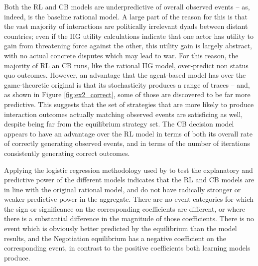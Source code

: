 Both the RL and CB models are underpredictive of overall observed events -- as, indeed, is the baseline rational model. A large part of the reason for this is that the vast majority of interactions are politically irrelevant dyads between distant countries; even if the IIG utility calculations indicate that one actor has utility to gain from threatening force against the other, this utility gain is largely abstract, with no actual concrete disputes which may lead to war. For this reason, the majority of RL an CB runs, like the rational IIG model, over-predict non status quo outcomes. However, an advantage that the agent-based model has over the game-theoretic original is that its stochasticity produces a range of traces -- and, as shown in Figure \ref{fig:ex2_correct}, some of those are discovered to be far more predictive. This suggests that the set of strategies that are more likely to produce interaction outcomes actually matching observed events are satisficing as well, despite being far from the equilibrium strategy set. The CB decision model appears to have an advantage over the RL model in terms of both its overall rate of correctly generating observed events, and in terms of the number of iterations consistently generating correct outcomes.

Applying the logistic regression methodology used by \citet{bennett_2000} to test the explanatory and predictive power of the different models indicates that the RL and CB models are in line with the original rational model, and do not have radically stronger or weaker predictive power in the aggregate. There are no event categories for which the sign or significance on the corresponding coefficients are different, or where there is a substantial difference in the magnitude of those coefficients. There is no event which is obviously better predicted by the equilibrium than the model results, and the Negotiation equilibrium has a negative coefficient on the corresponding event, in contrast to the positive coefficients both learning models produce.

